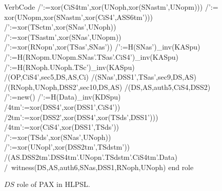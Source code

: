 \documentclass[journal,article,submit,moreauthors,pdftex]{Definitions/mdpi}
\begin{document}
\begin{figure}[H]
\begin {minipage}[t]{0.48\textwidth}
\begin{SaveVerbatim}{VerbCode}
  /':=xor(CiS4tm',xor(UNoph,xor(SNastm',UNopm)))
  /\SNas':= xor(UNopm,xor(SNastm',xor(CiS4',ASS6tm')))
  /\TSc':=xor(TSctm',xor(SNas',UNoph))
  /\TSas':=xor(TSastm',xor(SNas',UNopm))
  /\RNopl':=xor(RNopn',xor(TSas',SNas'))
  /':={H(SNas')}_inv(KASpu)
  /':={H(RNopm.UNopm.SNas'.TSas'.CiS4')}_inv(KASpu)
  /':={H(RNoph.UNoph.TSc')}_inv(KASpu)
  /\secret({OP,CiS4'},sec5,{DS,AS,Ci})
  /\secret({SNas',DSS1',TSas'},sec9,{DS,AS})
  /\secret({RNoph,UNoph,DSS2'},sec10,{DS,AS})
  /\request(DS,AS,auth5,{CiS4,DSS2})
  /\TSds':=new()
  /':={H(Data)}_inv(KDSpu)
  /\DSS4tm':=xor(DSS4',xor(DSS1',CiS4'))
  /\DSS2tm':=xor(DSS2',xor(DSS4',xor(TSds',DSS1')))
  /\CiS4tm':=xor(CiS4',xor(DSS1',TSds'))
  /\TSdstm':=xor(TSds',xor(SNas',UNoph))
  /\UNopn':=xor(UNopl',xor(DSS2tm',TSdstm'))
  /\SND(AS.DSS2tm'.DSS4tm'.UNopn'.TSdstm'.CiS4tm'.Data)
  /\ witness(DS,AS,auth6,{SNas,DSS1,RNoph,UNoph})
end role
\end{SaveVerbatim}
\setlength{\fboxsep}{1mm}

\caption{$DS$ role of PAX in HLPSL.}
\label{fig:avispa_ds}
\end{minipage}
\end{figure}
\end{document}
